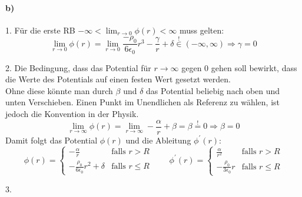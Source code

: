 \documentclass{article}
\newcommand{\epsz}{\epsilon_0}
\begin{document}
\paragraph{b)}
\par{1.}
Für die erste RB $-\infty < \lim_{r\rightarrow 0} \phi(r) < \infty$ muss
gelten:
\[
	\lim_{r\rightarrow 0} \phi(r) = \lim_{r\rightarrow 0}
	\frac{- \rho_0 }{6  \epsz} r^3 - \frac \gamma r + \delta
	\overset{!}{\in} (-\infty, \infty)
	\Rightarrow
	\gamma = 0
\]
\par{2.}
Die Bedingung, dass das Potential für $r \rightarrow \infty$ gegen 0 gehen
soll bewirkt, dass die Werte des Potentials auf einen festen Wert gesetzt werden. \\
Ohne diese könnte man durch $\beta$ und $\delta$ das Potential beliebig nach
oben und unten Verschieben. Einen Punkt im Unendlichen als Referenz zu
wählen, ist jedoch die Konvention in der Physik.
\[
	\lim_{r \rightarrow \infty} \phi(r) = \lim_{r \rightarrow \infty}
	-\frac{\alpha}{r} + \beta = \beta \overset{!}{=} 0
	\Rightarrow \beta = 0
\]
Damit folgt das Potential $\phi(r)$ und die Ableitung $\phi^\prime(r)$:
\[
	\phi(r) =
	\begin{cases}
		-\frac \alpha r & \text{falls } r > R \\
		-\frac{\rho_0}{6\epsz} r^2 + \delta
		& \text{falls } r \leq R
	\end{cases}
	\qquad
	\phi^\prime(r) =
	\begin{cases}
		\frac\alpha{r^2}
		& \text{falls } r > R \\
		-\frac{\rho_0}{3\epsz} r
		& \text{falls } r \leq R
	\end{cases}
\]
\newpage
\par{3.}




\newpage
\end{document}
